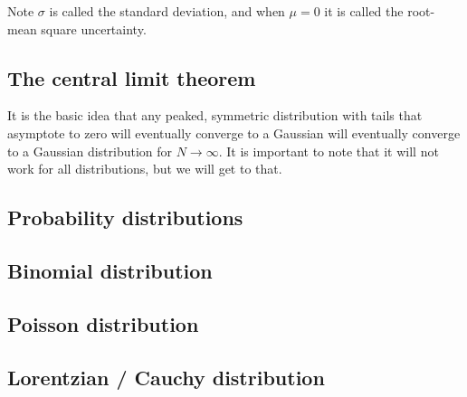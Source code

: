 \documentclass[a4paper]{article}
\begin{document}
Note $\sigma$ is called the standard deviation, and when $\mu=0$ it is called the root-mean square uncertainty.

\subsection{The central limit theorem}

It is the basic idea that any peaked, symmetric distribution with tails that asymptote to zero will eventually converge to a Gaussian will eventually converge to a Gaussian distribution for $N\rightarrow\infty$. It is important to note that it will not work for all distributions, but we will get to that.

\subsection{Probability distributions}

\subsection{Binomial distribution}

\subsection{Poisson distribution}

\subsection{Lorentzian / Cauchy distribution}
\end{document}
